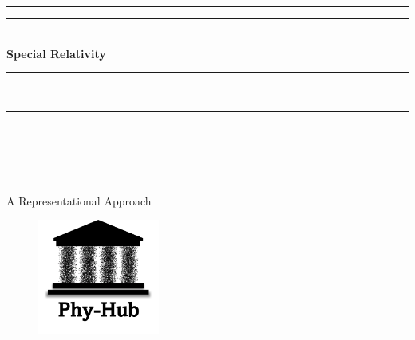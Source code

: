 \rule{\textwidth}{0pt}
\rule{\textwidth}{1pt} 
{ \Huge \bf {} \\ \vspace{0.3cm} \hspace*{\fill} Special Relativity \hspace*{\fill}}\\
\rule{\textwidth}{0pt}
\vspace{-1cm}\\
\rule{\textwidth}{1pt}
\vspace{-1.05cm}\\
\rule{\textwidth}{2pt}
\\
{ \\ \Huge \centering \hspace*{\fill} A Representational Approach \hspace*{\fill} }
\\
\vspace*{5cm}
\begin{figure}[ht]%
\centering
       \includegraphics[width=4cm]{images/png/PhyHub_Logo.png}
\end{figure}

\thispagestyle{empty}
\pagecolor{yellow}
\newpage